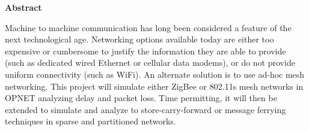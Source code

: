 \begin{center}
\textbf{Abstract}
\end{center}

Machine to machine communication has long been considered a feature of the next technological age. 
Networking options available today are either too expensive or cumbersome to justify the information they are able to provide (such as dedicated wired Ethernet or cellular data modems), or do not provide uniform connectivity (such as WiFi). 
An alternate solution is to use ad-hoc mesh networking. 
This project will simulate either ZigBee or 802.11s mesh networks in OPNET analyzing delay and packet loss. 
Time permitting, it will then be extended to simulate and analyze to store-carry-forward or message ferrying techniques in sparse and partitioned networks.

~\cite{adhocmsgferry}

~\cite{hybrid}

~\cite{Routing}